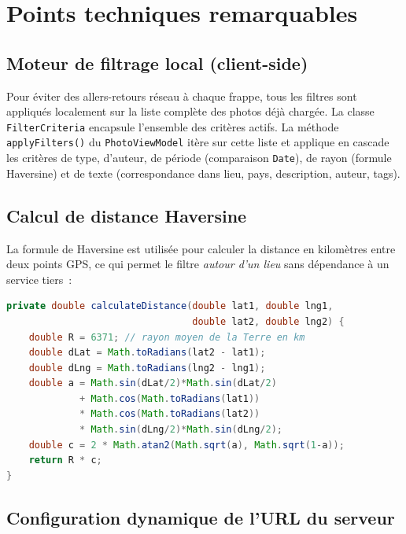 \documentclass[12pt, a4paper, openany]{report}
\begin{document}
\chapter{Points techniques remarquables}

\section{Moteur de filtrage local (client-side)}

Pour éviter des allers-retours réseau à chaque frappe, tous les filtres sont appliqués
localement sur la liste complète des photos déjà chargée. La classe \texttt{FilterCriteria}
encapsule l'ensemble des critères actifs. La méthode \texttt{applyFilters()} du
\texttt{PhotoViewModel} itère sur cette liste et applique en cascade les critères de type,
d'auteur, de période (comparaison \texttt{Date}), de rayon (formule Haversine) et de texte
(correspondance dans lieu, pays, description, auteur, tags).

\section{Calcul de distance Haversine}

La formule de Haversine est utilisée pour calculer la distance en kilomètres entre deux
points GPS, ce qui permet le filtre \emph{autour d'un lieu} sans dépendance à un service
tiers~:

\begin{lstlisting}[language=Java, caption=Calcul de distance Haversine (PhotoViewModel)]
private double calculateDistance(double lat1, double lng1,
                                 double lat2, double lng2) {
    double R = 6371; // rayon moyen de la Terre en km
    double dLat = Math.toRadians(lat2 - lat1);
    double dLng = Math.toRadians(lng2 - lng1);
    double a = Math.sin(dLat/2)*Math.sin(dLat/2)
             + Math.cos(Math.toRadians(lat1))
             * Math.cos(Math.toRadians(lat2))
             * Math.sin(dLng/2)*Math.sin(dLng/2);
    double c = 2 * Math.atan2(Math.sqrt(a), Math.sqrt(1-a));
    return R * c;
}
\end{lstlisting}

\section{Configuration dynamique de l'URL du serveur}
\end{document}
